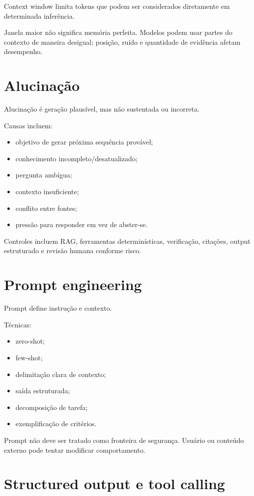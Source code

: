 Context window limita tokens que podem ser considerados diretamente em determinada inferência.

Janela maior não significa memória perfeita. Modelos podem usar partes do contexto de maneira desigual; posição, ruído e quantidade de evidência afetam desempenho.

\section{Alucinação}

Alucinação é geração plausível, mas não sustentada ou incorreta.

Causas incluem:
\begin{itemize}
\item objetivo de gerar próxima sequência provável;
\item conhecimento incompleto/desatualizado;
\item pergunta ambígua;
\item contexto insuficiente;
\item conflito entre fontes;
\item pressão para responder em vez de abster-se.
\end{itemize}

Controles incluem RAG, ferramentas determinísticas, verificação, citações, output estruturado e revisão humana conforme risco.

\section{Prompt engineering}

Prompt define instrução e contexto.

Técnicas:
\begin{itemize}
\item zero-shot;
\item few-shot;
\item delimitação clara de contexto;
\item saída estruturada;
\item decomposição de tarefa;
\item exemplificação de critérios.
\end{itemize}

Prompt não deve ser tratado como fronteira de segurança. Usuário ou conteúdo externo pode tentar modificar comportamento.

\section{Structured output e tool calling}

